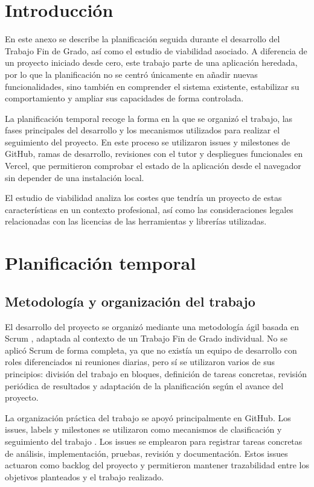 
\section{Introducción}

En este anexo se describe la planificación seguida durante el desarrollo del Trabajo Fin de Grado, así como el estudio de viabilidad asociado. A diferencia de un proyecto iniciado desde cero, este trabajo parte de una aplicación heredada, por lo que la planificación no se centró únicamente en añadir nuevas funcionalidades, sino también en comprender el sistema existente, estabilizar su comportamiento y ampliar sus capacidades de forma controlada.

La planificación temporal recoge la forma en la que se organizó el trabajo, las fases principales del desarrollo y los mecanismos utilizados para realizar el seguimiento del proyecto. En este proceso se utilizaron issues y milestones de GitHub, ramas de desarrollo, revisiones con el tutor y despliegues funcionales en Vercel, que permitieron comprobar el estado de la aplicación desde el navegador sin depender de una instalación local.

El estudio de viabilidad analiza los costes que tendría un proyecto de estas características en un contexto profesional, así como las consideraciones legales relacionadas con las licencias de las herramientas y librerías utilizadas.

\section{Planificación temporal}

\subsection{Metodología y organización del trabajo}

El desarrollo del proyecto se organizó mediante una metodología ágil basada en Scrum \cite{scrum-guide}, adaptada al contexto de un Trabajo Fin de Grado individual. No se aplicó Scrum de forma completa, ya que no existía un equipo de desarrollo con roles diferenciados ni reuniones diarias, pero sí se utilizaron varios de sus principios: división del trabajo en bloques, definición de tareas concretas, revisión periódica de resultados y adaptación de la planificación según el avance del proyecto.

La organización práctica del trabajo se apoyó principalmente en GitHub. Los issues, labels y milestones se utilizaron como mecanismos de clasificación y seguimiento del trabajo \cite{github-labels-milestones}. Los issues se emplearon para registrar tareas concretas de análisis, implementación, pruebas, revisión y documentación. Estos issues actuaron como backlog del proyecto y permitieron mantener trazabilidad entre los objetivos planteados y el trabajo realizado.

